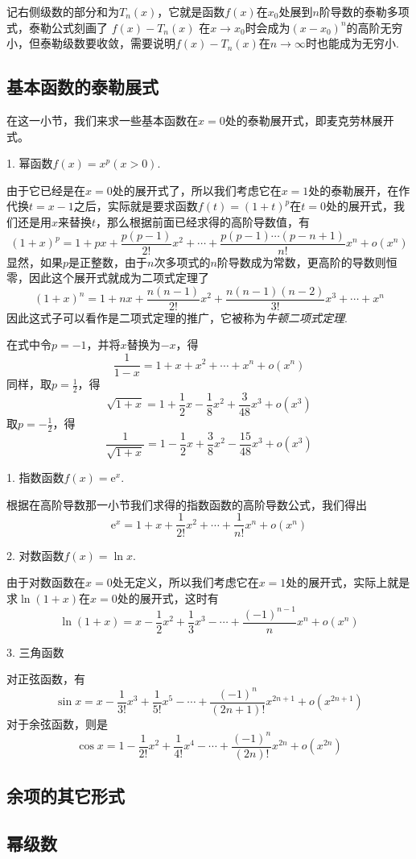 记右侧级数的部分和为$T_n(x)$，它就是函数$f(x)$在$x_0$处展到$n$阶导数的泰勒多项式，泰勒公式刻画了 $f(x)-T_n(x)$ 在$x\to x_0$时会成为$(x-x_0)^n$的高阶无穷小，但泰勒级数要收敛，需要说明$f(x)-T_n(x)$在$n\to\infty$时也能成为无穷小.

\subsection{基本函数的泰勒展式}
\label{sec:taylor-expand-for-fundation-function}

在这一小节，我们来求一些基本函数在$x=0$处的泰勒展开式，即麦克劳林展开式。

1. 幂函数$f(x)=x^p(x>0)$.

由于它已经是在$x=0$处的展开式了，所以我们考虑它在$x=1$处的泰勒展开，在作代换$t=x-1$之后，实际就是要求函数$f(t)=(1+t)^p$在$t=0$处的展开式，我们还是用$x$来替换$t$，那么根据前面已经求得的高阶导数值，有
\[ (1+x)^p = 1 + px + \frac{p(p-1)}{2!}x^2 + \cdots + \frac{p(p-1)\cdots (p-n+1)}{n!}x^n + o(x^n) \]
显然，如果$p$是正整数，由于$n$次多项式的$n$阶导数成为常数，更高阶的导数则恒零，因此这个展开式就成为二项式定理了
\[ (1+x)^n = 1+nx + \frac{n(n-1)}{2!}x^2 + \frac{n(n-1)(n-2)}{3!}x^3 + \cdots + x^n \]
因此这式子可以看作是二项式定理的推广，它被称为\emph{牛顿二项式定理}.

在式中令$p=-1$，并将$x$替换为$-x$，得
\[ \frac{1}{1-x} = 1+x+x^2 + \cdots + x^n + o(x^n) \]
同样，取$p=\frac{1}{2}$，得
\[ \sqrt{1+x} = 1+\frac{1}{2}x-\frac{1}{8}x^2+\frac{3}{48}x^3 + o(x^3) \]
取$p=-\frac{1}{2}$，得
\[ \frac{1}{\sqrt{1+x}} = 1-\frac{1}{2}x+\frac{3}{8}x^2 -\frac{15}{48}x^3 + o(x^3) \]

1. 指数函数$f(x)=\mathrm{e}^x$.

根据在高阶导数那一小节我们求得的指数函数的高阶导数公式，我们得出
\[ \mathrm{e}^x = 1+x+\frac{1}{2!}x^2 + \cdots + \frac{1}{n!}x^n + o(x^n) \]

2. 对数函数$f(x)=\ln{x}$.

由于对数函数在$x=0$处无定义，所以我们考虑它在$x=1$处的展开式，实际上就是求$\ln{(1+x)}$在$x=0$处的展开式，这时有
\[ \ln{(1+x)} = x - \frac{1}{2} x^2 + \frac{1}{3} x^3 - \cdots + \frac{(-1)^{n-1}}{n}x^n + o(x^n) \]

3. 三角函数

对正弦函数，有
\[ \sin{x} = x - \frac{1}{3!}x^3 + \frac{1}{5!} x^5 - \cdots + \frac{(-1)^n}{(2n+1)!}x^{2n+1} + o(x^{2n+1}) \]
对于余弦函数，则是
\[ \cos{x} = 1 - \frac{1}{2!}x^2 + \frac{1}{4!}x^4 - \cdots + \frac{(-1)^n}{(2n)!}x^{2n} + o(x^{2n}) \]

\subsection{余项的其它形式}
\label{sec:other-format-of-taylor-additional}

\subsection{幂级数}
\label{sec:power-series}



